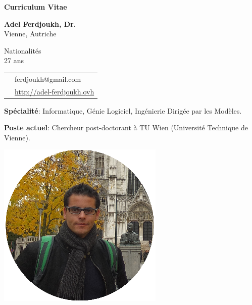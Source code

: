 \thispagestyle{empty}

\renewcommand\refname{~}

\begin{center}
\par\textbf{\huge Curriculum Vitae}
\end{center}

\vspace{.5cm}

\begin{minipage}{0.45\textwidth}
\textbf{Adel Ferdjoukh, Dr.} \\ 
Vienne, Autriche

\vspace{.3cm}

Nationalités \fr{} \dz{} \kab{} \\
27 ans \\

\begin{tabular}{cl}
\email{} & ferdjoukh@gmail.com\\

\web{} & \url{http://adel-ferdjoukh.ovh}\\
\end{tabular}

\medskip
{\bf Spécialité}: Informatique, Génie Logiciel, Ingénierie Dirigée par les Modèles.

\medskip
{\bf Poste actuel}: Chercheur post-doctorant à TU Wien (Université Technique de Vienne).


\end{minipage}
\hfill
\begin{minipage}{0.45\textwidth}
\begin{flushright}
\includegraphics[scale=0.25]{me2.png}~~~~~~~~
\end{flushright}
\end{minipage}


\tair

\sectionline{}
